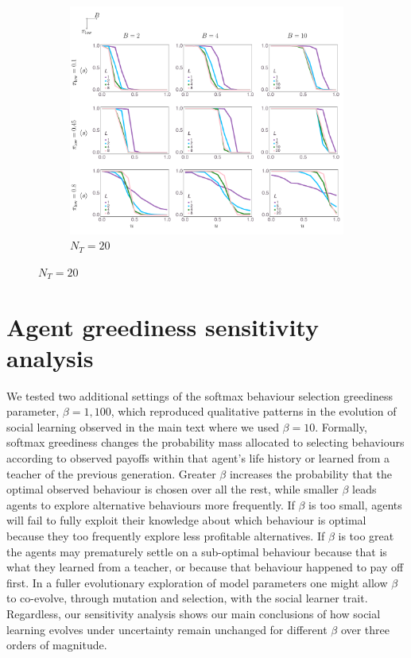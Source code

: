 \documentclass[letterpaper,11.5pt]{scrartcl}
\begin{document}
\begin{figure}
  \ContinuedFloat
  \begin{subfigure}{\textwidth}
	\caption{$N_T = 20$}
	\includegraphics[width=\textwidth]{Figures/supplement/nteachers=20/mainResultsPlots.pdf}
  \end{subfigure}
\end{figure}

\clearpage


\section{Agent greediness sensitivity analysis} 

We tested two additional settings of the softmax behaviour selection greediness parameter,
$\beta=1,100$, which reproduced qualitative patterns in the evolution of social learning
observed in the main text where we used $\beta=10$.  
Formally, softmax greediness changes the 
probability mass allocated to selecting behaviours according to observed payoffs within that agent's
life history or learned from a teacher of the previous generation. 
Greater $\beta$ increases the probability that the optimal
observed behaviour is chosen over all the rest, while smaller $\beta$ leads agents to explore alternative behaviours more frequently. If $\beta$ is too small, agents will fail to
fully exploit their knowledge about which behaviour is optimal because they too frequently
explore less profitable alternatives.  If $\beta$ is too great the agents may prematurely
settle on a sub-optimal behaviour because that is what they learned from a teacher, 
or because that behaviour happened to pay off first. In a fuller evolutionary
exploration of model parameters one might allow $\beta$ to co-evolve, through
mutation and selection, with the social learner trait.  
Regardless, our sensitivity analysis shows our main conclusions of how social learning evolves under uncertainty remain unchanged for different $\beta$ over three orders of magnitude.
\end{document}
